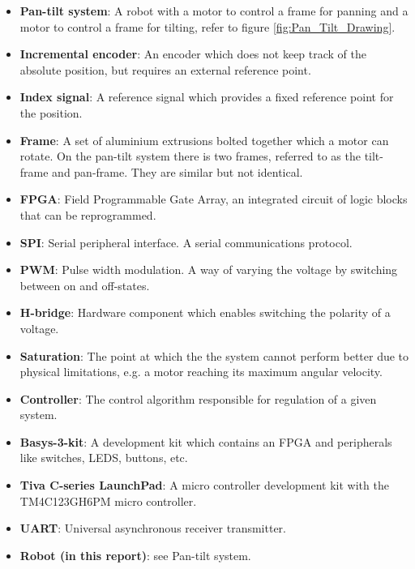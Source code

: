 \documentclass[../../main.tex]{subfiles}
\begin{document}
\label{sec:wordlist}
\begin{itemize}
    \item \textbf{Pan-tilt system}: A robot with a motor to control a frame for panning and a motor to control a frame for tilting, refer to figure \ref{fig:Pan_Tilt_Drawing}.
    \item \textbf{Incremental encoder}: An encoder which does not keep track of the absolute position, but requires an external reference point.
    \item \textbf{Index signal}: A reference signal which provides a fixed reference point for the position.
    \item \textbf{Frame}: A set of aluminium extrusions bolted together which a motor can rotate. On the pan-tilt system there is two frames, referred to as the tilt-frame and pan-frame. They are similar but not identical.
    \item \textbf{FPGA}: Field Programmable Gate Array, an integrated circuit of logic blocks that can be reprogrammed.
    \item \textbf{SPI}: Serial peripheral interface. A serial communications protocol.
    \item \textbf{PWM}: Pulse width modulation. A way of varying the voltage by switching between on and off-states.
    \item \textbf{H-bridge}: Hardware component which enables switching the polarity of a voltage.
    \item \textbf{Saturation}: The point at which the the system cannot perform better due to physical limitations, e.g. a motor reaching its maximum angular velocity.
    \item \textbf{Controller}: The control algorithm responsible for regulation of a given system.
    
    \item \textbf{Basys-3-kit}: A development kit which contains an FPGA and peripherals like switches, LEDS, buttons, etc.
    
    \item \textbf{Tiva C-series LaunchPad}: A micro controller development kit with the TM4C123GH6PM micro controller.
    
    
    \item \textbf{UART}: Universal asynchronous receiver transmitter.
    \item \textbf{Robot (in this report)}: see Pan-tilt system.
    

\end{itemize}
\end{document}
